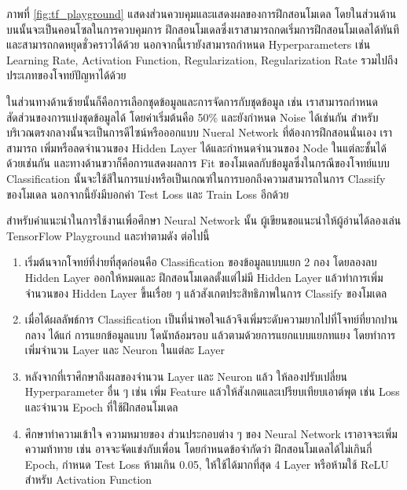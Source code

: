 ภาพที่ \ref{fig:tf_playground} แสดงส่วนควบคุมและแสดงผลของการฝึกสอนโมเดล โดยในส่วนด้านบนนั้นจะเป็นคอนโซลในการควบคุมการ%
ฝึกสอนโมเดลซึ่งเราสามารถกดเริ่มการฝึกสอนโมเดลได้ทันที และสามารถกดหยุดชั่วคราวได้ด้วย นอกจากนี้เรายังสามารถกำหนด Hyperparameters 
เช่น Learning Rate, Activation Function, Regularization, Regularization Rate รวมไปถึงประเภทของโจทย์ปัญหาได้ด้วย

ในส่วนทางด้านซ้ายนั้นก็คือการเลือกชุดข้อมูลและการจัดการกับชุดข้อมูล เช่น เราสามารถกำหนดสัดส่วนของการแบ่งชุดข้อมูลได้ โดยค่าเริ่มต้นคือ 50\%
และยังกำหนด Noise ได้เช่นกัน สำหรับบริเวณตรงกลางนั้นจะเป็นการดีไซน์หรือออกแบบ Nueral Network ที่ต้องการฝึกสอนนั่นเอง เราสามารถ%
เพิ่มหรือลดจำนวนของ Hidden Layer ได้และกำหนดจำนวนของ Node ในแต่ละชั้นได้ด้วยเช่นกัน และทางด้านขวาก็คือการแสดงผลการ Fit 
ของโมเดลกับข้อมูลซึ่งในกรณีของโจทย์แบบ Classification นั้นจะใช้สีในการแบ่งหรือเป็นเกณฑ์ในการบอกถึงความสามารถในการ Classify 
ของโมเดล นอกจากนี้ยังมีบอกค่า Test Loss และ Train Loss อีกด้วย

สำหรับคำแนะนำในการใช้งานเพื่อศึกษา Neural Network นั้น ผู้เขียนขอแนะนำให้ผู้อ่านได้ลองเล่น TensorFlow Playground และทำตามดัง%
ต่อไปนี้

\begin{enumerate}
    \item เริ่มต้นจากโจทย์ที่ง่ายที่สุดก่อนคือ Classification ของข้อมูลแบบแยก 2 กอง โดยลองลบ Hidden Layer ออกให้หมดและ%
    ฝึกสอนโมเดลตั้งแต่ไม่มี Hidden Layer แล้วทำการเพิ่มจำนวนของ Hidden Layer ขึ้นเรื่อย ๆ แล้วสังเกตประสิทธิภาพในการ Classify 
    ของโมเดล
    
    \item เมื่อได้ผลลัพธ์การ Classification เป็นที่น่าพอใจแล้วจึงเพิ่มระดับความยากไปที่โจทย์ที่ยากปานกลาง ได้แก่ การแยกข้อมูลแบบ%
    โดนัทล้อมรอบ แล้วตามด้วยการแยกแบบแยกทแยง โดยทำการเพิ่มจำนวน Layer และ Neuron ในแต่ละ Layer 
    
    \item หลังจากที่เราศึกษาถึงผลของจำนวน Layer และ Neuron แล้ว ให้ลองปรับเปลี่ยน Hyperparameter อื่น ๆ เช่น เพิ่ม Feature 
    แล้วให้สังเกตและเปรียบเทียบเอาต์พุต เช่น Loss และจำนวน Epoch ที่ใช้ฝึกสอนโมเดล
    
    \item ศึกษาทำความเข้าใจ ความหมายของ ส่วนประกอบต่าง ๆ ของ Neural Network เราอาจจะเพิ่มความท้าทาย เช่น อาจจะจัดแข่งกับเพื่อน%
    โดยกำหนดข้อจำกัดว่า ฝึกสอนโมเดลได้ไม่เกินกี่ Epoch, กำหนด Test Loss ห้ามเกิน 0.05, ให้ใช้ได้มากที่สุด 4 Layer หรือห้ามใช้ ReLU 
    สำหรับ Activation Function
\end{enumerate}

